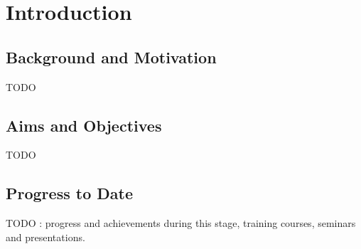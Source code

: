 \chapter{Introduction}

\section{Background and Motivation}

TODO

\section{Aims and Objectives}

TODO

\section{Progress to Date}

TODO : progress and achievements during this stage, training courses, seminars and presentations.